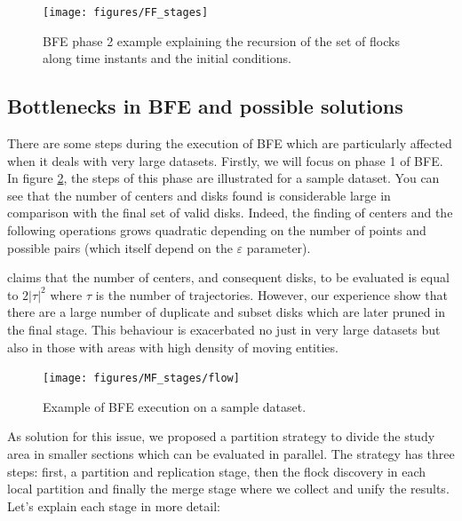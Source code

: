 \begin{figure}[!ht]
    \centering
    \texttt{[image: figures/FF\_stages]}
    \caption{BFE phase 2 example explaining the recursion of the set of flocks along time instants and the initial conditions.}\label{fig:FF_stages}
\end{figure}

\subsection{Bottlenecks in BFE and possible solutions}
There are some steps during the execution of BFE which are particularly affected when it deals with very large datasets.  Firstly, we will focus on phase 1 of BFE.  In figure \ref{fig:example}, the steps of this phase are illustrated for a sample dataset.  You can see that the number of centers and disks found is considerable large in comparison with the final set of valid disks.  Indeed, the finding of centers and the following operations grows quadratic depending on the number of points and possible pairs (which itself depend on the $\varepsilon$ parameter).   

\cite{vieira_2009} claims that the number of centers, and consequent disks, to be evaluated is equal to $2\lvert\tau\rvert^2$ where $\tau$ is the number of trajectories.  However, our experience show that there are a large number of duplicate and subset disks which are later pruned in the final stage.  This behaviour is exacerbated no just in very large datasets but also in those with areas with high density of moving entities.

\begin{figure}
    \centering
    \texttt{[image: figures/MF\_stages/flow]}
    \caption{Example of BFE execution on a sample dataset.}\label{fig:example}
\end{figure}

As solution for this issue, we proposed a partition strategy to divide the study area in smaller sections which can be evaluated in parallel.  The strategy has three steps: first, a partition and replication stage, then the flock discovery in each local partition and finally the merge stage where we collect and unify the results.  Let's explain each stage in more detail:

